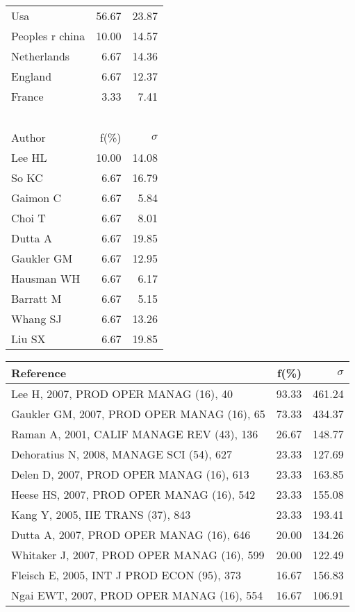 \documentclass[a4paper,11pt]{report}
\begin{document}
\begin{landscape}
\begin{table}[!ht]
{\begin{tabular}{|l r r|}
\hline
Usa & 56.67 & 23.87\\
Peoples r china & 10.00 & 14.57\\
Netherlands & 6.67 & 14.36\\
England & 6.67 & 12.37\\
France & 3.33 & 7.41\\
 &  & \\
 &  & \\
 &  & \\
 &  & \\
 &  & \\
\hline
\hline
Author & f(\%) & $\sigma$\\
\hline
Lee HL & 10.00 & 14.08\\
So KC & 6.67 & 16.79\\
Gaimon C & 6.67 & 5.84\\
Choi T & 6.67 & 8.01\\
Dutta A & 6.67 & 19.85\\
Gaukler GM & 6.67 & 12.95\\
Hausman WH & 6.67 & 6.17\\
Barratt M & 6.67 & 5.15\\
Whang SJ & 6.67 & 13.26\\
Liu SX & 6.67 & 19.85\\
\hline
\end{tabular}
}
{\scriptsize\begin{tabular}{|l r r|}
\hline
Reference & f(\%) & $\sigma$\\
\hline
Lee H, 2007, PROD OPER MANAG (16), 40 & 93.33 & 461.24\\
Gaukler GM, 2007, PROD OPER MANAG (16), 65 & 73.33 & 434.37\\
Raman A, 2001, CALIF MANAGE REV (43), 136 & 26.67 & 148.77\\
Dehoratius N, 2008, MANAGE SCI (54), 627 & 23.33 & 127.69\\
Delen D, 2007, PROD OPER MANAG (16), 613 & 23.33 & 163.85\\
Heese HS, 2007, PROD OPER MANAG (16), 542 & 23.33 & 155.08\\
Kang Y, 2005, IIE TRANS (37), 843 & 23.33 & 193.41\\
Dutta A, 2007, PROD OPER MANAG (16), 646 & 20.00 & 134.26\\
Whitaker J, 2007, PROD OPER MANAG (16), 599 & 20.00 & 122.49\\
Fleisch E, 2005, INT J PROD ECON (95), 373 & 16.67 & 156.83\\
Ngai EWT, 2007, PROD OPER MANAG (16), 554 & 16.67 & 106.91\\

\end{tabular}}
\end{table}
\end{landscape}
\end{document}
